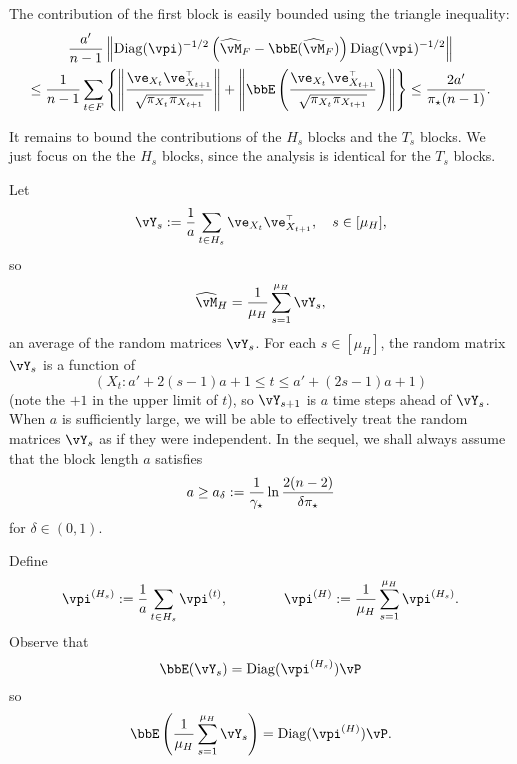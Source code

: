 The contribution of the first block is easily bounded using the
triangle inequality:
\begin{multline}
  \frac{a'}{n-1}
  \Norm{
    \Diag(\vpi)^{-1/2}
    \Parens{
      \wh\vM_F - \bbE(\wh\vM_F)
    }
    \Diag(\vpi)^{-1/2}
  }
  \\
  \leq
  \frac1{n-1} \sum_{t \in F}
  \Braces{
    \Norm{
      \frac{
        \ve_{X_t} \ve_{X_{t+1}}^\t
      }{\sqrt{\pi_{X_t}\pi_{X_{t+1}}}}
    }
    +
    \Norm{
      \bbE\Parens{
        \frac{
          \ve_{X_t} \ve_{X_{t+1}}^\t
        }{\sqrt{\pi_{X_t}\pi_{X_{t+1}}}}
      }
    }
  }
  \leq
  \frac{2a'}{\pimin(n-1)}
  .
  \label{eq:first-block}
\end{multline}

It remains to bound the contributions of the $H_s$ blocks and the
$T_s$ blocks.
We just focus on the the $H_s$ blocks, since the analysis is identical
for the $T_s$ blocks.

Let
\[
  \vY_s := \frac1a \sum_{t \in H_s} \ve_{X_t} \ve_{X_{t+1}}^\t ,
  \quad s \in [\mu_H] ,
\]
so
\[
  \wh{\vM}_H = \frac1{\mu_H} \sum_{s=1}^{\mu_H} \vY_s ,
\]
an average of the random matrices $\vY_s$.
For each $s \in [\mu_H]$, the random matrix $\vY_s$ is a function of
\[ (X_t : a' + 2(s-1)a + 1 \leq t \leq a' + (2s-1)a + 1) \]
(note the $+1$ in the upper limit of $t$),
so $\vY_{s+1}$ is $a$ time steps ahead of $\vY_s$.
When $a$ is sufficiently large, we will be able to effectively treat
the random matrices $\vY_s$ as if they were independent.
In the sequel, we shall always assume that the block length $a$
satisfies
\begin{equation}
  \label{eq:block-length}
  a \geq
  a_\delta
  :=
  \frac{1}{\gamma_{\star}} \ln \frac{2(n-2)}{\delta\pi_{\star}}
\end{equation}
for $\delta \in (0,1)$.

Define%
\begin{align*}
  \vpi^{(H_s)}  := \frac1a \sum_{t \in H_s} \vpi^{(t)} , \qquad \qquad
  \vpi^{(H)}  := \frac1{\mu_H} \sum_{s=1}^{\mu_H} \vpi^{(H_s)} .
\end{align*}
Observe that
\[
  \bbE(\vY_s)
  = \Diag(\vpi^{(H_s)}) \vP
\]
so
\[
  \bbE\Parens{
    \frac1{\mu_H} \sum_{s=1}^{\mu_H} \vY_s
  } = \Diag(\vpi^{(H)}) \vP
  .
\]

